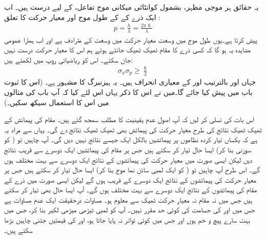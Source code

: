  یہ حقائق ہر موجی مظہر، بشمول کوانٹائی میکانی موج تفاعل، کے لیے درست ہیں۔ اب ایک ذرے کے  کے طول موج اور معیار حرکت کا تعلق :
\begin{align}\label{مساوات_تفاعل_موج_ڈی_بروگلی_معیار_حرکت}
p=\frac{h}{\lambda}=\frac{2\pi\hslash}{\lambda}
\end{align}
پیش کرتا ہے۔یوں طول موج میں وسعت معیار حرکت میں وسعت کے مترادف ہے اور اب ہمارا عمومی مشاہدہ یہ ہو گا کہ کسی ذرے کا مقام ٹھیک ٹھیک جانتے ہوئے ہم اس کا معیار حرکت درست نہیں جان سکتے۔ اس کو ریاضیاتی روپ میں لکھتے ہیں:
\begin{align}\label{مساوات_تفاعل_موج_اصول_عدم_یقینیت}
\sigma_{x}\sigma_{p}\ge\frac{\hslash}{2}
\end{align}
جہاں  اور  بالترتیب  اور  کے معیاری انحراف ہیں۔ یہ ہیزنبرگ کا مشہور  ہے۔ (اس کا ثبوت باب  میں پیش کیا جائے گا۔میں نے اس کا ذکر یہاں اس لئے کیا کہ آپ باب  کی مثالوں میں اس کا استعمال سیکھ سکیں۔)

 اس بات کی تسلی کر لیں کہ آپ اصول عدم یقینیت کا مطلب سمجھ گئے ہیں۔ مقام کی پیمائش کے ٹھیک ٹھیک نتائج کی طرح معیار حرکت کی پیمائش بھی ٹھیک ٹھیک نتائج دے گی۔ یہاں  سے مراد یہ ہے کہ یکساں تیار کردہ نظاموں پر پیمائشیں بالکل ایک جیسے نتائج نہیں دیں گی۔ آپ چاہیں تو ( کو سوزنی بنا کر) ایسا حال تیار کر سکتے ہیں جس پر مقام کی پیمائشیں ایک دوسرے سے قریب نتائج دیں لیکن ایسی صورت میں معیار حرکت کی پیمائشوں کے نتائج ایک دوسرے سے بہت مختلف ہوں گے۔ اس طرح آپ چاہیں تو ( کو ایک لمبی سائن نما موج بنا کر) ایسا حال تیار کر سکتے ہیں جس پر معیار حرکت کی پیمائشوں کے نتائج ایک دوسرے کے قریب ہوں گے لیکن ایسی صورت میں ذرے کے مقام کی پیمائشوں کے نتائج ایک دوسرے سے بہت مختلف ہوں گے۔ آپ ایسا حال بھی تیار کر سکتے ہیں جس میں نہ مقام نہ معیار حرکت ٹھیک سے معلوم ہو۔ مساوات  درحقیقت ایک عدم مساوات ہے جس میں  اور  کی جسامت کی کوئی حد مقرر نہیں۔ آپ  کو لمبی ٹیڑھی میڑھی لکیر بنا کر، جس میں بہت سارے پیچ و خم ہوں اور جس میں کوئی تواتر نہ پایا جاتا ہو،  اور  کی قیمتیں جتنی چاہیں بڑھا سکتے ہیں۔

